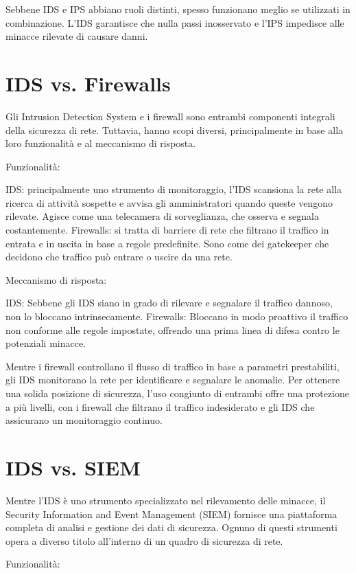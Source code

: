 Sebbene IDS e IPS abbiano ruoli distinti, spesso funzionano meglio se utilizzati in combinazione. L’IDS garantisce che nulla passi inosservato e l’IPS impedisce alle minacce rilevate di causare danni.

\section{IDS vs. Firewalls}
Gli Intrusion Detection System e i firewall sono entrambi componenti integrali della sicurezza di rete. Tuttavia, hanno scopi diversi, principalmente in base alla loro funzionalità e al meccanismo di risposta.

Funzionalità:

IDS: principalmente uno strumento di monitoraggio, l’IDS scansiona la rete alla ricerca di attività sospette e avvisa gli amministratori quando queste vengono rilevate. Agisce come una telecamera di sorveglianza, che osserva e segnala costantemente.
Firewalls: si tratta di barriere di rete che filtrano il traffico in entrata e in uscita in base a regole predefinite. Sono come dei gatekeeper che decidono che traffico può entrare o uscire da una rete.
 

Meccanismo di risposta:

IDS: Sebbene gli IDS siano in grado di rilevare e segnalare il traffico dannoso, non lo bloccano intrinsecamente.
Firewalls: Bloccano in modo proattivo il traffico non conforme alle regole impostate, offrendo una prima linea di difesa contro le potenziali minacce.
 

Mentre i firewall controllano il flusso di traffico in base a parametri prestabiliti, gli IDS monitorano la rete per identificare e segnalare le anomalie. Per ottenere una solida posizione di sicurezza, l’uso congiunto di entrambi offre una protezione a più livelli, con i firewall che filtrano il traffico indesiderato e gli IDS che assicurano un monitoraggio continuo.

\section{IDS vs. SIEM}
 Mentre l’IDS è uno strumento specializzato nel rilevamento delle minacce, il Security Information and Event Management (SIEM) fornisce una piattaforma completa di analisi e gestione dei dati di sicurezza. Ognuno di questi strumenti opera a diverso titolo all’interno di un quadro di sicurezza di rete.

Funzionalità:

